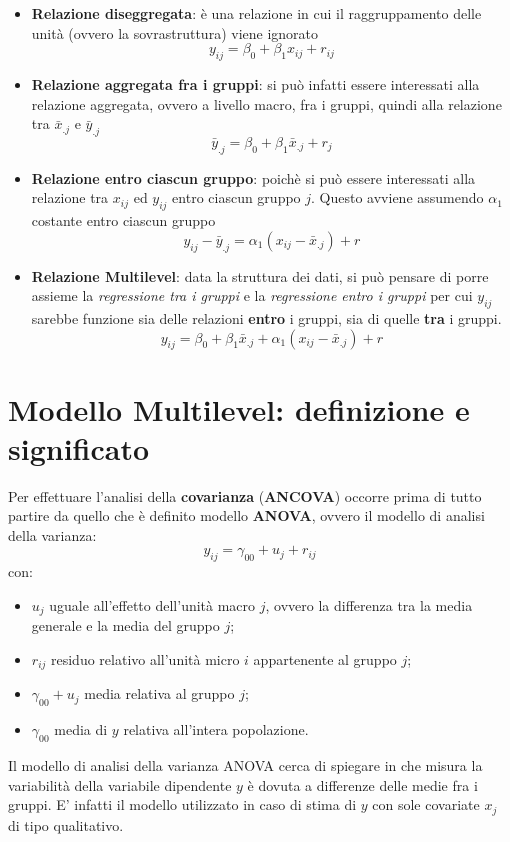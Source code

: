 \documentclass[a4page, 11pt]{article} %
\begin{document}
\begin{itemize}
\item \textbf{Relazione diseggregata}: è una relazione in cui il raggruppamento delle unità (ovvero la sovrastruttura) viene ignorato
\begin{equation*}
y_{ij} = \beta_0 + \beta_1 x_{ij} +r_{ij} 
\end{equation*}
\item \textbf{Relazione aggregata fra i gruppi}: si può infatti essere interessati alla relazione aggregata, ovvero a livello macro, fra i gruppi, quindi alla relazione tra $\bar{x}_{.j}$ e $\bar{y}_{.j}$
\begin{equation*}
\bar{y}_{.j} = \beta_0 + \beta_1 \bar{x}_{.j} + r_j
\end{equation*}
\item \textbf{Relazione entro ciascun gruppo}: poichè si può essere interessati alla relazione tra $x_{ij}$ ed $y_{ij}$ entro ciascun gruppo $j$. Questo avviene assumendo $\alpha_1$ costante entro ciascun gruppo
\begin{equation*}
y_{ij} - \bar{y}_{.j} = \alpha_1(x_{ij} - \bar{x}_{.j}) + r
\end{equation*}
\item \textbf{Relazione Multilevel}: data la struttura dei dati, si può pensare di porre assieme la \textit{regressione tra i gruppi} e la \textit{regressione entro i gruppi} per cui $y_{ij}$ sarebbe funzione sia delle relazioni \textbf{entro} i gruppi, sia di quelle \textbf{tra} i gruppi.
\begin{equation*}
y_{ij} = \beta_0 + \beta_1 \bar{x}_{.j} +\alpha_1(x_{ij} - \bar{x}_{.j}) + r
\end{equation*} 
\end{itemize}

\section{Modello Multilevel: definizione e significato}
Per effettuare l'analisi della \textbf{covarianza} (\textbf{ANCOVA}) occorre prima di tutto partire da quello che è definito modello \textbf{ANOVA}, ovvero il modello di analisi della varianza:
\begin{equation*}
y_{ij} = \gamma_{00} + u_j +r_{ij}
\end{equation*}
con:
\begin{itemize}
\item $u_j$ uguale all'effetto dell'unità macro $j$, ovvero la differenza tra la media generale e la media del gruppo $j$;
\item $r_{ij}$ residuo relativo all'unità micro $i$ appartenente al gruppo $j$;
\item $\gamma_{00}+u_j$ media relativa al gruppo $j$;
\item $\gamma_{00}$ media di $y$ relativa all'intera popolazione.
\end{itemize}
Il modello di analisi della varianza ANOVA cerca di spiegare in che misura la variabilità della variabile dipendente $y$ è dovuta a differenze delle medie fra i gruppi. E' infatti il modello utilizzato in caso di stima di $y$ con sole covariate $x_j$ di tipo qualitativo.
\end{document}
